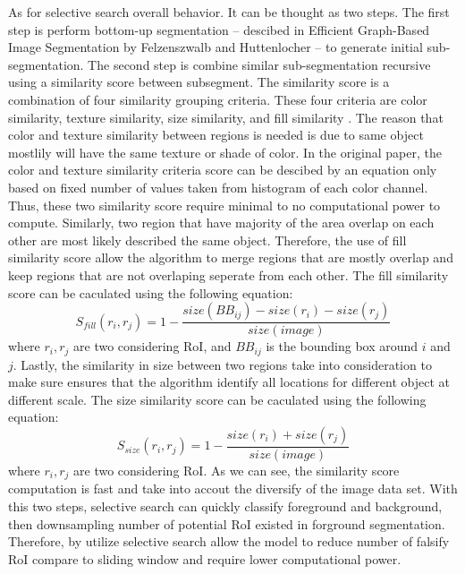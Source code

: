 As for selective search overall behavior. It can be thought as two steps. The first step is perform bottom-up segmentation -- descibed in Efficient Graph-Based Image Segmentation by Felzenszwalb and Huttenlocher \cite{felzenszwalb_huttenlocher_2004} -- to generate initial sub-segmentation. The second step is combine similar sub-segmentation recursive using a similarity score between subsegment. The similarity score is a combination of four similarity grouping criteria. These four criteria are color similarity, texture similarity, size similarity, and fill similarity \cite{selective_search_2013}. The reason that color and texture similarity between regions is needed is due to same object mostlily will have the same texture or shade of color. In the original paper, the color and texture similarity criteria score can be descibed by an equation only based on fixed number of values taken from histogram of each color channel. Thus, these two similarity score require minimal to no computational power to compute. Similarly, two region that have majority of the area overlap on each other are most likely described the same object. Therefore, the use of fill similarity score allow the algorithm to merge regions that are mostly overlap and keep regions that are not overlaping seperate from each other. The fill similarity score can be caculated using the following equation: 
%
\begin{equation*}
    S_{fill}(r_i, r_j) = 1-\frac{size(BB_{ij})-size(r_i)-size(r_j)}{size(image)}
\end{equation*}
%
where $r_i, r_j$ are two considering RoI, and $BB_{ij}$ is the bounding box around $i$ and $j$. Lastly, the similarity in size between two regions take into consideration to make sure ensures that the algorithm identify all locations for different object at different scale. The size similarity score can be caculated using the following equation: 
%
\begin{equation*}
    S_{size}(r_i, r_j) = 1-\frac{size(r_i)+size(r_j)}{size(image)}
\end{equation*}
%
where $r_i, r_j$ are two considering RoI. As we can see, the similarity score computation is fast and take into accout the diversify of the image data set. With this two steps, selective search can quickly classify foreground and background, then downsampling number of potential RoI existed in forground segmentation. Therefore, by utilize selective search allow the model to reduce number of falsify RoI compare to sliding window and require lower computational power.

